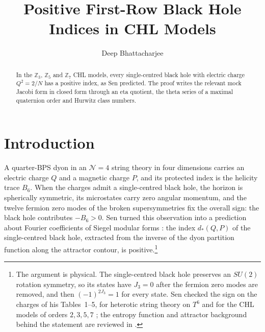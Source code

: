 \documentclass[11pt]{amsart}
\title{Positive First-Row Black Hole Indices in CHL Models}
\author{Deep Bhattacharjee}
\numberwithin{equation}{section}
\theoremstyle{plain}
\theoremstyle{remark}
\newcommand{\Z}{\mathbb{Z}}
\begin{document}
\begin{abstract}
In the $\Z_3$, $\Z_5$ and $\Z_7$ CHL models, every single-centred black hole with electric charge $Q^2=2/N$ has a positive index, as Sen predicted. The proof writes the relevant mock Jacobi form in closed form through an eta quotient, the theta series of a maximal quaternion order and Hurwitz class numbers.
\end{abstract}
\maketitle


\section{Introduction}

A quarter-BPS dyon in an $\mathcal N=4$ string theory in four dimensions carries an electric charge $Q$ and a magnetic charge $P$, and its protected index is the helicity trace $B_6$. When the charges admit a single-centred black hole, the horizon is spherically symmetric, its microstates carry zero angular momentum, and the twelve fermion zero modes of the broken supersymmetries fix the overall sign: the black hole contributes $-B_6>0$. Sen turned this observation into a prediction about Fourier coefficients of Siegel modular forms \cite{Sen11}: the index $d_*(Q,P)$ of the single-centred black hole, extracted from the inverse of the dyon partition function along the attractor contour, is positive.\footnote{The argument is physical. The single-centred black hole preserves an $SU(2)$ rotation symmetry, so its states have $J_3=0$ after the fermion zero modes are removed, and then $(-1)^{2J_3}=1$ for every state. Sen checked the sign on the charges of his Tables~1--5, for heterotic string theory on $T^6$ and for the CHL models of orders $2,3,5,7$ \cite{Sen11}; the entropy function and attractor background behind the statement are reviewed in \cite{Sen08}.}
\end{document}
